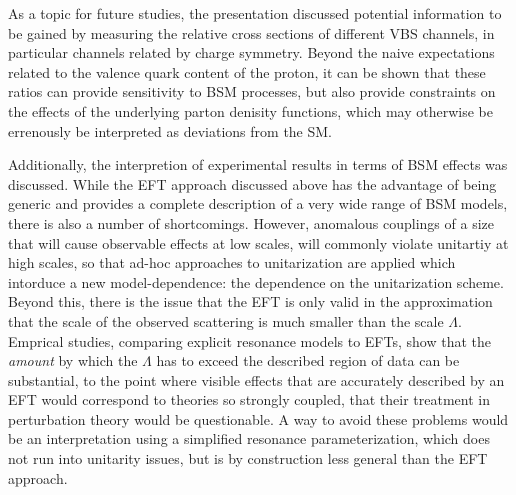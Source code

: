 As a topic for future studies, the presentation discussed potential information to be gained by measuring the relative cross sections of different VBS channels, in particular channels related by charge symmetry. Beyond the naive expectations related to the valence quark content of the proton, it can be shown that these ratios can provide sensitivity to BSM processes, but also provide constraints on the effects of the underlying parton denisity functions, which may otherwise be errenously be interpreted as deviations from the SM.

Additionally, the interpretion of experimental results in terms of BSM effects was discussed. While the EFT approach discussed above has the advantage of being generic and provides a complete description of a very wide range of BSM models, there is also a number of shortcomings. However, anomalous couplings of a size that will cause observable effects at low scales, will  commonly violate unitartiy at high scales, so that ad-hoc approaches to unitarization are applied which intorduce a new model-dependence: the dependence on the unitarization scheme.
Beyond this, there is the issue that the EFT is only valid in the approximation that the scale of the observed scattering is much smaller than the scale $\Lambda$. Emprical studies, comparing explicit resonance models to EFTs, show that the \textit{amount} by which the $\Lambda$ has to exceed the described region of data can be substantial, to the point where visible effects that are accurately described by an EFT would correspond to theories so strongly coupled, that their treatment in perturbation theory would be questionable. A way to avoid these problems would be an interpretation using a simplified resonance parameterization, which does not run into unitarity issues, but is by construction less general than the EFT approach.



